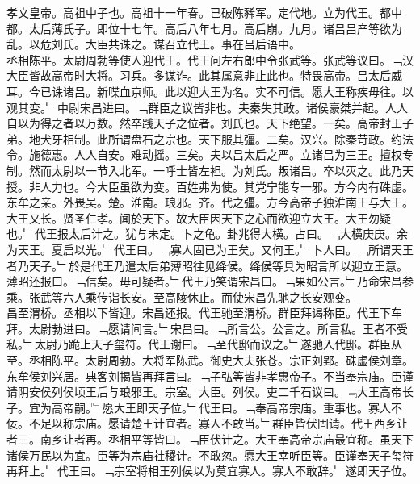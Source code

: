 \documentclass{zhvt-classic}
\begin{document}





\hspace*{2em}孝文皇帝。高祖中子也。高祖十一年春。已破陈豨军。定代地。立为代王。都中都。太后薄氏子。即位十七年。高后八年七月。高后崩。九月。诸吕吕产等欲为乱。以危刘氏。大臣共诛之。谋召立代王。事在吕后语中。\\
\hspace*{2em}丞相陈平。太尉周勃等使人迎代王。代王问左右郎中令张武等。张武等议曰。﹁汉大臣皆故高帝时大将。习兵。多谋诈。此其属意非止此也。特畏高帝。吕太后威耳。今已诛诸吕。新喋血京师。此以迎大王为名。实不可信。愿大王称疾毋往。以观其变。﹂中尉宋昌进曰。﹁群臣之议皆非也。夫秦失其政。诸侯豪桀并起。人人自以为得之者以万数。然卒践天子之位者。刘氏也。天下绝望。一矣。高帝封王子弟。地犬牙相制。此所谓盘石之宗也。天下服其彊。二矣。汉兴。除秦苛政。约法令。施德惠。人人自安。难动摇。三矣。夫以吕太后之严。立诸吕为三王。擅权专制。然而太尉以一节入北军。一呼士皆左袒。为刘氏。叛诸吕。卒以灭之。此乃天授。非人力也。今大臣虽欲为变。百姓弗为使。其党宁能专一邪。方今内有硃虚。东牟之亲。外畏吴。楚。淮南。琅邪。齐。代之彊。方今高帝子独淮南王与大王。大王又长。贤圣仁孝。闻於天下。故大臣因天下之心而欲迎立大王。大王勿疑也。﹂代王报太后计之。犹与未定。卜之龟。卦兆得大横。占曰。﹁大横庚庚。余为天王。夏启以光。﹂代王曰。﹁寡人固已为王矣。又何王。﹂卜人曰。﹁所谓天王者乃天子。﹂於是代王乃遣太后弟薄昭往见绛侯。绛侯等具为昭言所以迎立王意。薄昭还报曰。﹁信矣。毋可疑者。﹂代王乃笑谓宋昌曰。﹁果如公言。﹂乃命宋昌参乘。张武等六人乘传诣长安。至高陵休止。而使宋昌先驰之长安观变。\\
\hspace*{2em}昌至渭桥。丞相以下皆迎。宋昌还报。代王驰至渭桥。群臣拜谒称臣。代王下车拜。太尉勃进曰。﹁愿请间言。﹂宋昌曰。﹁所言公。公言之。所言私。王者不受私。﹂太尉乃跪上天子玺符。代王谢曰。﹁至代邸而议之。﹂遂驰入代邸。群臣从至。丞相陈平。太尉周勃。大将军陈武。御史大夫张苍。宗正刘郢。硃虚侯刘章。东牟侯刘兴居。典客刘揭皆再拜言曰。﹁子弘等皆非孝惠帝子。不当奉宗庙。臣谨请阴安侯列侯顷王后与琅邪王。宗室。大臣。列侯。吏二千石议曰。﹃大王高帝长子。宜为高帝嗣。﹄愿大王即天子位。﹂代王曰。﹁奉高帝宗庙。重事也。寡人不佞。不足以称宗庙。愿请楚王计宜者。寡人不敢当。﹂群臣皆伏固请。代王西乡让者三。南乡让者再。丞相平等皆曰。﹁臣伏计之。大王奉高帝宗庙最宜称。虽天下诸侯万民以为宜。臣等为宗庙社稷计。不敢忽。愿大王幸听臣等。臣谨奉天子玺符再拜上。﹂代王曰。﹁宗室将相王列侯以为莫宜寡人。寡人不敢辞。﹂遂即天子位。\\
\end{document}
